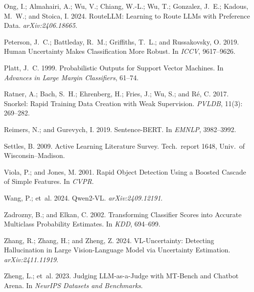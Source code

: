 \documentclass[letterpaper]{article} %
\begin{document}
\begin{thebibliography}{}
Ong, I.; Almahairi, A.; Wu, V.; Chiang, W.-L.; Wu, T.; Gonzalez, J.~E.;
Kadous, M.~W.; and Stoica, I. 2024.
\newblock RouteLLM: Learning to Route LLMs with Preference Data.
\newblock \emph{arXiv:2406.18665}.

Peterson, J.~C.; Battleday, R.~M.; Griffiths, T.~L.; and Russakovsky, O. 2019.
\newblock Human Uncertainty Makes Classification More Robust.
\newblock In \emph{ICCV}, 9617--9626.

Platt, J.~C. 1999.
\newblock Probabilistic Outputs for Support Vector Machines.
\newblock In \emph{Advances in Large Margin Classifiers}, 61--74.

Ratner, A.; Bach, S.~H.; Ehrenberg, H.; Fries, J.; Wu, S.; and R\'e, C. 2017.
\newblock Snorkel: Rapid Training Data Creation with Weak Supervision.
\newblock \emph{PVLDB}, 11(3): 269--282.

Reimers, N.; and Gurevych, I. 2019.
\newblock Sentence-BERT.
\newblock In \emph{EMNLP}, 3982--3992.

Settles, B. 2009.
\newblock Active Learning Literature Survey.
\newblock Tech.\ report 1648, Univ.\ of Wisconsin--Madison.

Viola, P.; and Jones, M. 2001.
\newblock Rapid Object Detection Using a Boosted Cascade of Simple Features.
\newblock In \emph{CVPR}.

Wang, P.; et~al. 2024.
\newblock Qwen2-VL.
\newblock \emph{arXiv:2409.12191}.

Zadrozny, B.; and Elkan, C. 2002.
\newblock Transforming Classifier Scores into Accurate Multiclass Probability Estimates.
\newblock In \emph{KDD}, 694--699.

Zhang, R.; Zhang, H.; and Zheng, Z. 2024.
\newblock VL-Uncertainty: Detecting Hallucination in Large Vision-Language
Model via Uncertainty Estimation.
\newblock \emph{arXiv:2411.11919}.

Zheng, L.; et~al. 2023.
\newblock Judging LLM-as-a-Judge with MT-Bench and Chatbot Arena.
\newblock In \emph{NeurIPS Datasets and Benchmarks}.

\end{thebibliography}
\end{document}
